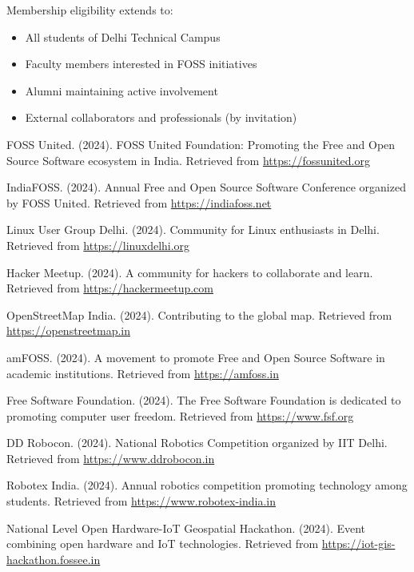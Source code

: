 \documentclass[12pt,a4paper]{article}
\begin{document}
Membership eligibility extends to:
\begin{itemize}
    \item All students of Delhi Technical Campus
    \item Faculty members interested in FOSS initiatives
    \item Alumni maintaining active involvement
    \item External collaborators and professionals (by invitation)
\end{itemize}

\begin{thebibliography}{20}

FOSS United. (2024). FOSS United Foundation: Promoting the Free and Open Source Software ecosystem in India. Retrieved from \url{https://fossunited.org}

IndiaFOSS. (2024). Annual Free and Open Source Software Conference organized by FOSS United. Retrieved from \url{https://indiafoss.net}

Linux User Group Delhi. (2024). Community for Linux enthusiasts in Delhi. Retrieved from \url{https://linuxdelhi.org}

Hacker Meetup. (2024). A community for hackers to collaborate and learn. Retrieved from \url{https://hackermeetup.com}

OpenStreetMap India. (2024). Contributing to the global map. Retrieved from \url{https://openstreetmap.in}

amFOSS. (2024). A movement to promote Free and Open Source Software in academic institutions. Retrieved from \url{https://amfoss.in}

Free Software Foundation. (2024). The Free Software Foundation is dedicated to promoting computer user freedom. Retrieved from \url{https://www.fsf.org}

DD Robocon. (2024). National Robotics Competition organized by IIT Delhi. Retrieved from \url{https://www.ddrobocon.in}

Robotex India. (2024). Annual robotics competition promoting technology among students. Retrieved from \url{https://www.robotex-india.in}

National Level Open Hardware-IoT Geospatial Hackathon. (2024). Event combining open hardware and IoT technologies. Retrieved from \url{https://iot-gis-hackathon.fossee.in}



\end{thebibliography}
\end{document}
